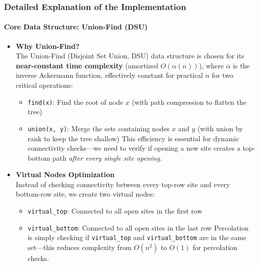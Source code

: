 \documentclass[11pt]{article}
\providecommand{\tightlist}{%
      \setlength{\itemsep}{0pt}\setlength{\parskip}{0pt}}
\begin{document}
    \subsubsection{Detailed Explanation of the
Implementation}\label{detailed-explanation-of-the-implementation}

\paragraph{Core Data Structure: Union-Find
(DSU)}\label{core-data-structure-union-find-dsu}

\begin{itemize}
\tightlist
\item
  \textbf{Why Union-Find?}\\
  The Union-Find (Disjoint Set Union, DSU) data structure is chosen for
  its \textbf{near-constant time complexity} (amortized
  \(O(\alpha(n))\)), where \(\alpha\) is the inverse Ackermann function,
  effectively constant for practical \(n\) for two critical operations:

  \begin{itemize}
  \tightlist
  \item
    \texttt{find(x)}: Find the root of node \(x\) (with path compression
    to flatten the tree)
  \item
    \texttt{union(x,\ y)}: Merge the sets containing nodes \(x\) and
    \(y\) (with union by rank to keep the tree shallow) This efficiency
    is essential for dynamic connectivity checks---we need to verify if
    opening a new site creates a top-bottom path \emph{after every
    single site opening}.
  \end{itemize}
\item
  \textbf{Virtual Nodes Optimization}\\
  Instead of checking connectivity between every top-row site and every
  bottom-row site, we create two virtual nodes:

  \begin{itemize}
  \tightlist
  \item
    \texttt{virtual\_top}: Connected to all open sites in the first row
  \item
    \texttt{virtual\_bottom}: Connected to all open sites in the last
    row Percolation is simply checking if \texttt{virtual\_top} and
    \texttt{virtual\_bottom} are in the same set---this reduces
    complexity from \(O(n^2)\) to \(O(1)\) for percolation checks.
  \end{itemize}
\end{itemize}
\end{document}
